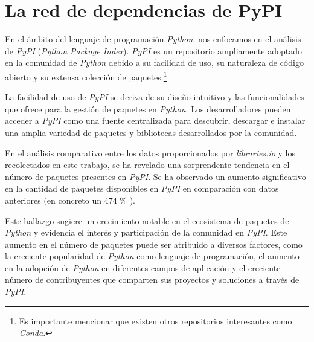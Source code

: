 \newpage

\section{La red de dependencias de PyPI}

En el ámbito del lenguaje de programación \textit{Python}, nos enfocamos en el análisis de \textit{PyPI}
(\textit{Python Package Index}). \textit{PyPI} es un repositorio ampliamente adoptado en la comunidad de
\textit{Python} debido a su facilidad de uso, su naturaleza de código abierto y su extensa colección de
paquetes.\footnote{Es importante mencionar que existen otros repositorios interesantes como \textit{Conda}.}

La facilidad de uso de \textit{PyPI} se deriva de su diseño intuitivo y las funcionalidades que ofrece
para la gestión de paquetes en \textit{Python}. Los desarrolladores pueden acceder a \textit{PyPI} como
una fuente centralizada para descubrir, descargar e instalar una amplia variedad de paquetes y bibliotecas
desarrollados por la comunidad.

En el análisis comparativo entre los datos proporcionados por \textit{libraries.io} y los recolectados en
este trabajo, se ha revelado una sorprendente tendencia en el número de paquetes presentes en \textit{PyPI}.
Se ha observado un aumento significativo en la cantidad de paquetes disponibles en \textit{PyPI} en
comparación con datos anteriores (en concreto un 474 \% ).

Este hallazgo sugiere un crecimiento notable en el ecosistema de paquetes de \textit{Python} y evidencia
el interés y participación de la comunidad en \textit{PyPI}. Este aumento en el número de paquetes puede
ser atribuido a diversos factores, como la creciente popularidad de \textit{Python} como lenguaje de
programación, el aumento en la adopción de \textit{Python} en diferentes campos de aplicación y el
creciente número de contribuyentes que comparten sus proyectos y soluciones a través de \textit{PyPI}.


